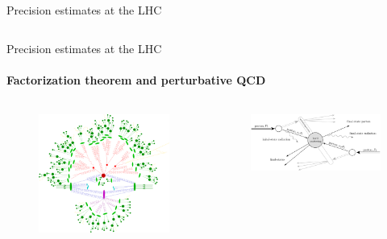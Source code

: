 \begin{frame}{Precision estimates at the LHC}
\begin{columns}
\begin{column}{0.5\textwidth}
    \end{column}

  \end{columns}

\end{frame}


\begin{frame}{Precision estimates at the LHC}
  \framesubtitle{Factorization theorem and perturbative QCD}

  \begin{columns}

    \begin{column}{0.5 \textwidth}

      \begin{figure}
        \centering
        \includegraphics[width = \textwidth]{../imgs/hadr-scatt.pdf}
      \end{figure}

    \end{column}

    \begin{column}{0.5 \textwidth}

      \begin{figure}
        \centering
        \includegraphics[width = \textwidth]{../imgs/part-scatt.png}
      \end{figure}


\end{column}
\end{columns}
\end{frame}
